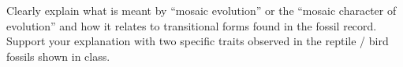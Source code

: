 
\showpoints

\question[4]\label{ques:fossil_predictions}
Clearly explain what is meant by “mosaic evolution” or the “mosaic character of evolution” and how it relates to transitional forms found in the fossil record.  Support your explanation with two specific traits observed in the reptile / bird fossils shown in class. 



